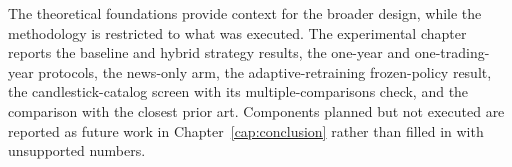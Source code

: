The theoretical foundations provide context for the broader design, while the methodology is restricted to what was executed. The experimental chapter reports the baseline and hybrid strategy results, the one-year and one-trading-year protocols, the news-only arm, the adaptive-retraining frozen-policy result, the candlestick-catalog screen with its multiple-comparisons check, and the comparison with the closest prior art. Components planned but not executed are reported as future work in Chapter~\ref{cap:conclusion} rather than filled in with unsupported numbers.
